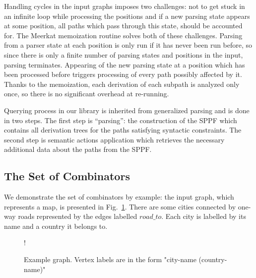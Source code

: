 Handling cycles in the input graphs imposes two challenges: not to get stuck in an infinite loop while processing the positions and if a new parsing state appears at some position, all paths which pass through this state, should be accounted for.
The Meerkat memoization routine solves both of these challenges.
Parsing from a parser state at each position is only run if it has never been run before, so since there is only a finite number of parsing states and positions in the input, parsing terminates.
Appearing of the new parsing state at a position which has been processed before triggers processing of every path possibly affected by it.
Thanks to the memoization, each derivation of each subpath is analyzed only once, so there is no significant overhead at re-running.


Querying process in our library is inherited from generalized parsing and is done in two steps.
The first step is ``parsing'': the construction of the SPPF which contains all derivation trees for the paths satisfying syntactic constraints.
The second step is semantic actions application which retrieves the necessary additional data about the paths from the SPPF.

\subsection{The Set of Combinators}

We demonstrate the set of combinators by example: the input graph, which represents a map, is presented in Fig.~\ref{fig:graph}.
There are some cities connected by one-way roads represented by the edges labelled $road\_to$.
Each city is labelled by its name and a country it belongs to.

\begin{figure}[h]
 {!}
{
}
\caption{Example graph. Vertex labels are in the form "city-name (country-name)"}
\label{fig:graph}
\end{figure}

